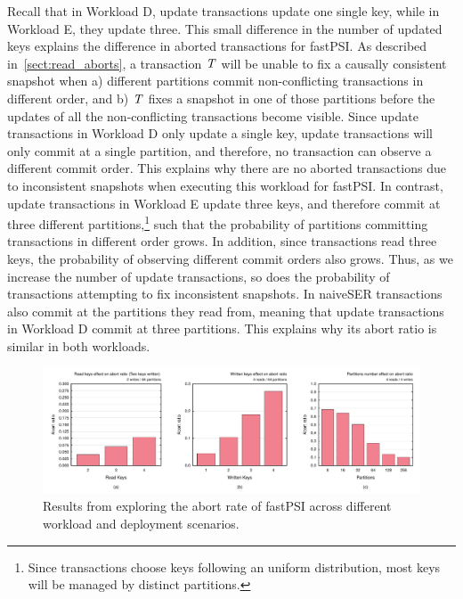 Recall that in Workload D, update transactions update one single key, while in Workload E, they update three. This small difference in the number of updated keys explains the difference in aborted transactions for fastPSI. As described in~\ref{sect:read_aborts}, a transaction $\mathit{T}$ will be unable to fix a causally consistent snapshot when a) different partitions commit non-conflicting transactions in different order, and b) $\mathit{T}$ fixes a snapshot in one of those partitions before the updates of all the non-conflicting transactions become visible. Since update transactions in Workload D only update a single key, update transactions will only commit at a single partition, and therefore, no transaction can observe a different commit order. This explains why there are no aborted transactions due to inconsistent snapshots when executing this workload for fastPSI. In contrast, update transactions in Workload E update three keys, and therefore commit at three different partitions,\footnote{Since transactions choose keys following an uniform distribution, most keys will be managed by distinct partitions.} such that the probability of partitions committing transactions in different order grows. In addition, since transactions read three keys, the probability of observing different commit orders also grows. Thus, as we increase the number of update transactions, so does the probability of transactions attempting to fix inconsistent snapshots. In naiveSER transactions also commit at the partitions they read from, meaning that update transactions in Workload D commit at three partitions. This explains why its abort ratio is similar in both workloads.

\begin{figure}[t]
\begin{center}
\includegraphics[width=\textwidth]{figures/psi_read_abort_bench.pdf}
\vspace{-1cm}
\end{center}
\caption{Results from exploring the abort rate of fastPSI across different workload and deployment scenarios.}
\label{fig:fastpsi_abort_rate}
\end{figure}

